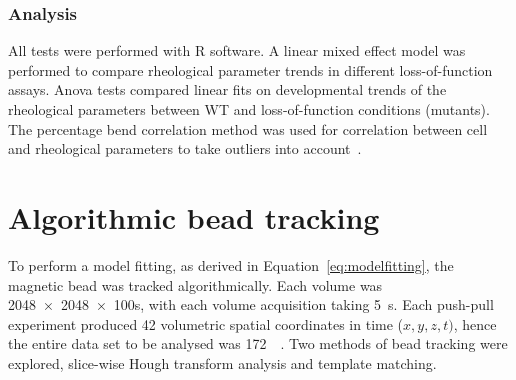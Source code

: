 \subsubsection{Analysis}

All tests were performed with R software.
A linear mixed effect model was performed to compare rheological parameter trends in different loss-of-function assays.
Anova tests compared linear fits on developmental trends of the rheological parameters between \gls{WT} and loss-of-function conditions (mutants).
The percentage bend correlation method was used for correlation between cell and rheological parameters to take outliers into account~\cite{wilcoxPercentageBendCorrelation1994}. %

%
%

\section{Algorithmic bead tracking}

To perform a model fitting, as derived in Equation~\eqref{eq:modelfitting}, the magnetic bead was tracked algorithmically.
Each volume was \SI{2048 x 2048 x 100}{}s, with each volume acquisition taking \SI{5}{\second}.
Each push-pull experiment produced 42 volumetric spatial coordinates in time (\(x,y,z,t)\), hence the entire data set to be analysed was \SI{172}{\giga\byte}.
Two methods of bead tracking were explored, slice-wise Hough transform analysis and template matching.
%

